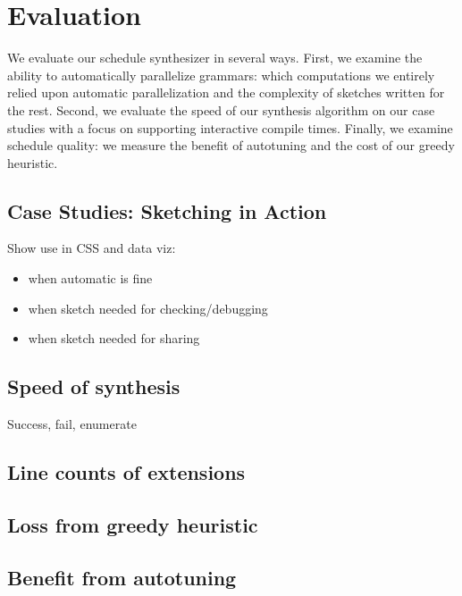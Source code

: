 \section{Evaluation}
We evaluate our schedule synthesizer in several ways. First, we examine the ability to automatically parallelize grammars: which computations we entirely relied upon automatic parallelization and the complexity of sketches written for the rest. Second, we evaluate the speed of our synthesis algorithm on our case studies with a focus on supporting interactive compile times. Finally, we examine schedule quality: we measure the benefit of autotuning and the cost of our greedy heuristic.


\subsection{Case Studies: Sketching in Action}
Show use in CSS and data viz: 
\begin{itemize}
\item when automatic is fine
\item when sketch needed for checking/debugging
\item when sketch needed for sharing
\end{itemize}
\subsection{Speed of synthesis}
Success, fail, enumerate
\subsection{Line counts of extensions}
\subsection{Loss from greedy heuristic}
\subsection{Benefit from autotuning}


